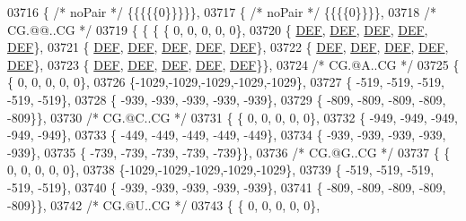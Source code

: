 \begin{DoxyCode}
03716 \{ \textcolor{comment}{/* noPair */} \{\{\{\{\{0\}\}\}\}\},
03717 \{ \textcolor{comment}{/* noPair */} \{\{\{\{0\}\}\}\},
03718 \textcolor{comment}{/* CG.@@..CG */}
03719 \{ \{ \{ \{  0, 0, 0, 0, 0\},
03720 \{  \mbox{\hyperlink{1_88_84__epars_8h_a397419fc12b37ed479c8abb9d444d843}{DEF}},  \mbox{\hyperlink{1_88_84__epars_8h_a397419fc12b37ed479c8abb9d444d843}{DEF}},  \mbox{\hyperlink{1_88_84__epars_8h_a397419fc12b37ed479c8abb9d444d843}{DEF}},  \mbox{\hyperlink{1_88_84__epars_8h_a397419fc12b37ed479c8abb9d444d843}{DEF}},  \mbox{\hyperlink{1_88_84__epars_8h_a397419fc12b37ed479c8abb9d444d843}{DEF}}\},
03721 \{  \mbox{\hyperlink{1_88_84__epars_8h_a397419fc12b37ed479c8abb9d444d843}{DEF}},  \mbox{\hyperlink{1_88_84__epars_8h_a397419fc12b37ed479c8abb9d444d843}{DEF}},  \mbox{\hyperlink{1_88_84__epars_8h_a397419fc12b37ed479c8abb9d444d843}{DEF}},  \mbox{\hyperlink{1_88_84__epars_8h_a397419fc12b37ed479c8abb9d444d843}{DEF}},  \mbox{\hyperlink{1_88_84__epars_8h_a397419fc12b37ed479c8abb9d444d843}{DEF}}\},
03722 \{  \mbox{\hyperlink{1_88_84__epars_8h_a397419fc12b37ed479c8abb9d444d843}{DEF}},  \mbox{\hyperlink{1_88_84__epars_8h_a397419fc12b37ed479c8abb9d444d843}{DEF}},  \mbox{\hyperlink{1_88_84__epars_8h_a397419fc12b37ed479c8abb9d444d843}{DEF}},  \mbox{\hyperlink{1_88_84__epars_8h_a397419fc12b37ed479c8abb9d444d843}{DEF}},  \mbox{\hyperlink{1_88_84__epars_8h_a397419fc12b37ed479c8abb9d444d843}{DEF}}\},
03723 \{  \mbox{\hyperlink{1_88_84__epars_8h_a397419fc12b37ed479c8abb9d444d843}{DEF}},  \mbox{\hyperlink{1_88_84__epars_8h_a397419fc12b37ed479c8abb9d444d843}{DEF}},  \mbox{\hyperlink{1_88_84__epars_8h_a397419fc12b37ed479c8abb9d444d843}{DEF}},  \mbox{\hyperlink{1_88_84__epars_8h_a397419fc12b37ed479c8abb9d444d843}{DEF}},  \mbox{\hyperlink{1_88_84__epars_8h_a397419fc12b37ed479c8abb9d444d843}{DEF}}\}\},
03724 \textcolor{comment}{/* CG.@A..CG */}
03725 \{ \{  0, 0, 0, 0, 0\},
03726 \{-1029,-1029,-1029,-1029,-1029\},
03727 \{ -519, -519, -519, -519, -519\},
03728 \{ -939, -939, -939, -939, -939\},
03729 \{ -809, -809, -809, -809, -809\}\},
03730 \textcolor{comment}{/* CG.@C..CG */}
03731 \{ \{  0, 0, 0, 0, 0\},
03732 \{ -949, -949, -949, -949, -949\},
03733 \{ -449, -449, -449, -449, -449\},
03734 \{ -939, -939, -939, -939, -939\},
03735 \{ -739, -739, -739, -739, -739\}\},
03736 \textcolor{comment}{/* CG.@G..CG */}
03737 \{ \{  0, 0, 0, 0, 0\},
03738 \{-1029,-1029,-1029,-1029,-1029\},
03739 \{ -519, -519, -519, -519, -519\},
03740 \{ -939, -939, -939, -939, -939\},
03741 \{ -809, -809, -809, -809, -809\}\},
03742 \textcolor{comment}{/* CG.@U..CG */}
03743 \{ \{  0, 0, 0, 0, 0\},

\end{DoxyCode}

